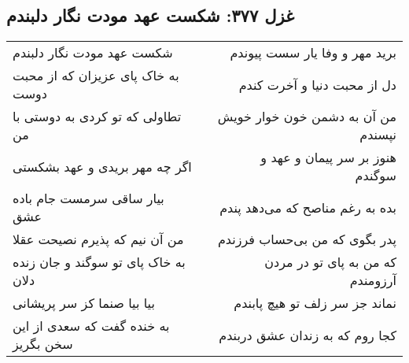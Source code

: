 \begin{center}
\section*{غزل ۳۷۷: شکست عهد مودت نگار دلبندم}
\label{sec:377}
\begin{longtable}{l p{0.5cm} r}
شکست عهد مودت نگار دلبندم
&&
برید مهر و وفا یار سست پیوندم
\\
به خاک پای عزیزان که از محبت دوست
&&
دل از محبت دنیا و آخرت کندم
\\
تطاولی که تو کردی به دوستی با من
&&
من آن به دشمن خون خوار خویش نپسندم
\\
اگر چه مهر بریدی و عهد بشکستی
&&
هنوز بر سر پیمان و عهد و سوگندم
\\
بیار ساقی سرمست جام باده عشق
&&
بده به رغم مناصح که می‌دهد پندم
\\
من آن نیم که پذیرم نصیحت عقلا
&&
پدر بگوی که من بی‌حساب فرزندم
\\
به خاک پای تو سوگند و جان زنده دلان
&&
که من به پای تو در مردن آرزومندم
\\
بیا بیا صنما کز سر پریشانی
&&
نماند جز سر زلف تو هیچ پابندم
\\
به خنده گفت که سعدی از این سخن بگریز
&&
کجا روم که به زندان عشق دربندم
\\
\end{longtable}
\end{center}
